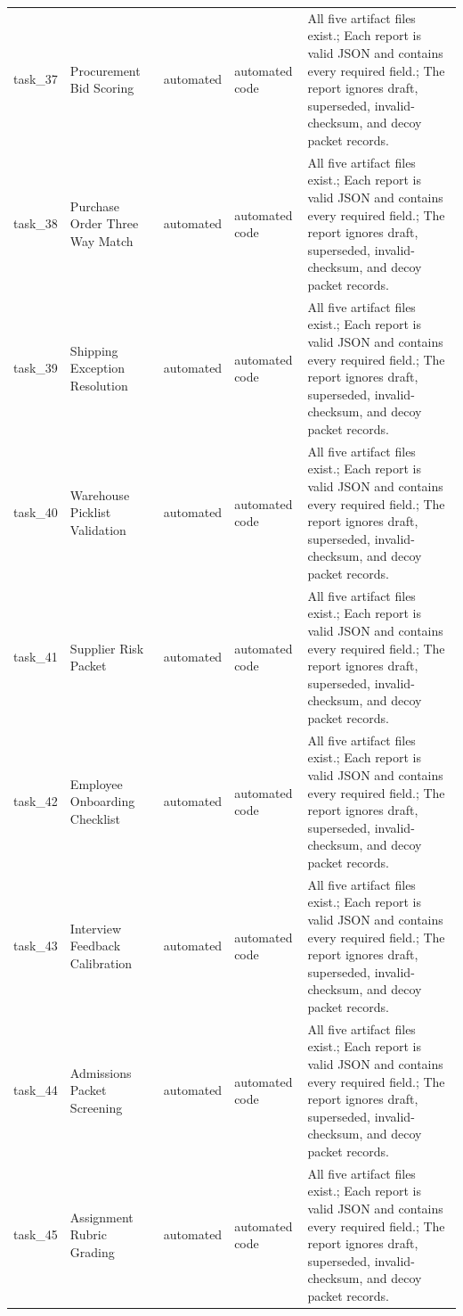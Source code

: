 \documentclass[11pt]{article}
\begin{document}
\begin{longtable}{L{0.07\textwidth}L{0.21\textwidth}L{0.11\textwidth}L{0.16\textwidth}L{0.38\textwidth}}
task\_37 & Procurement Bid Scoring & automated & automated code & All five artifact files exist.; Each report is valid JSON and contains every required field.; The report ignores draft, superseded, invalid-checksum, and decoy packet records. \\
task\_38 & Purchase Order Three Way Match & automated & automated code & All five artifact files exist.; Each report is valid JSON and contains every required field.; The report ignores draft, superseded, invalid-checksum, and decoy packet records. \\
task\_39 & Shipping Exception Resolution & automated & automated code & All five artifact files exist.; Each report is valid JSON and contains every required field.; The report ignores draft, superseded, invalid-checksum, and decoy packet records. \\
task\_40 & Warehouse Picklist Validation & automated & automated code & All five artifact files exist.; Each report is valid JSON and contains every required field.; The report ignores draft, superseded, invalid-checksum, and decoy packet records. \\
task\_41 & Supplier Risk Packet & automated & automated code & All five artifact files exist.; Each report is valid JSON and contains every required field.; The report ignores draft, superseded, invalid-checksum, and decoy packet records. \\
task\_42 & Employee Onboarding Checklist & automated & automated code & All five artifact files exist.; Each report is valid JSON and contains every required field.; The report ignores draft, superseded, invalid-checksum, and decoy packet records. \\
task\_43 & Interview Feedback Calibration & automated & automated code & All five artifact files exist.; Each report is valid JSON and contains every required field.; The report ignores draft, superseded, invalid-checksum, and decoy packet records. \\
task\_44 & Admissions Packet Screening & automated & automated code & All five artifact files exist.; Each report is valid JSON and contains every required field.; The report ignores draft, superseded, invalid-checksum, and decoy packet records. \\
task\_45 & Assignment Rubric Grading & automated & automated code & All five artifact files exist.; Each report is valid JSON and contains every required field.; The report ignores draft, superseded, invalid-checksum, and decoy packet records. \\

\end{longtable}
\end{document}
